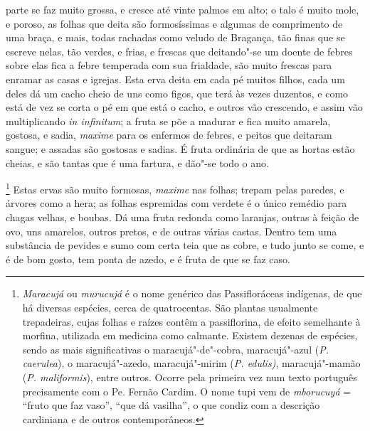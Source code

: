 parte se faz muito grossa, e cresce até vinte palmos em alto; o talo é
muito mole, e poroso, as folhas que deita são formosíssimas e algumas
de comprimento de uma braça, e mais, todas rachadas como veludo de
Bragança, tão finas que se escreve nelas, tão verdes, e frias, e
frescas que deitando"-se um doente de febres sobre elas fica a febre
temperada com sua frialdade, são muito frescas para enramar as casas e
igrejas. Esta erva deita em cada pé muitos filhos, cada um deles dá um
cacho cheio de uns como figos, que terá às vezes duzentos, e como está
de vez se corta o pé em que está o cacho, e outros vão crescendo, e
assim vão multiplicando \textit{in infinitum}; a fruta se põe a madurar e fica
muito amarela, gostosa, e sadia, \textit{maxime} para os enfermos de febres, e
peitos que deitaram sangue; e assadas são gostosas e sadias. É fruta
ordinária de que as hortas estão cheias, e são tantas que é uma
fartura, e dão"-se todo o ano.

\footnote{ \textit{Maracujá} ou \textit{murucujá} 
é o nome genérico das Passifloráceas indígenas, de que há diversas
espécies, cerca de quatrocentas. São plantas usualmente trepadeiras,
cujas folhas e raízes contêm a passiflorina, de efeito semelhante à
morfina, utilizada em medicina como calmante. Existem dezenas de
espécies, sendo as mais significativas o maracujá"-de"-cobra,
maracujá"-azul (\textit{P. caerulea}), o maracujá"-azedo, maracujá"-mirim
(\textit{P. edulis)}, maracujá"-mamão (\textit{P. maliformis}), entre
outros. Ocorre pela primeira vez num texto português precisamente com o
Pe. Fernão Cardim. O nome tupi vem de \textit{mborucuyá} = ``fruto que
faz vaso'', ``que dá vasilha'', o que condiz com a descrição cardiniana e
de outros contemporâneos.} Estas ervas são muito formosas,
\textit{maxime} nas folhas; trepam pelas paredes, e árvores como a hera; as
folhas espremidas com verdete é o único remédio para chagas velhas, e
boubas. Dá uma fruta redonda como laranjas, outras à feição de ovo, uns
amarelos, outros pretos, e de outras várias castas. Dentro tem uma
substância de pevides e sumo com certa teia que as cobre, e tudo junto
se come, e é de bom gosto, tem ponta de azedo, e é fruta de que se faz caso.

